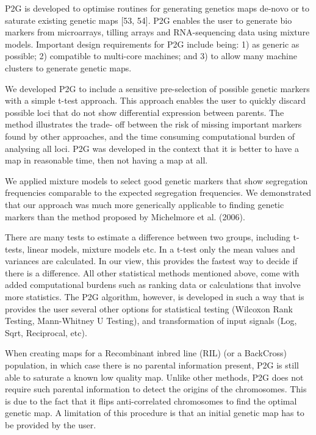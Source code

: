 P2G is developed to optimise routines for generating genetics maps de-novo or to saturate existing genetic maps [53, 54]. P2G enables 
the user to generate bio markers from microarrays, tilling arrays and RNA-sequencing data using mixture models. Important design 
requirements for P2G include being: 1) as generic as possible; 2) compatible to multi-core machines; and 3) to allow many machine 
clusters to generate genetic maps.

We developed P2G to include a sensitive pre-selection of possible genetic markers with a simple t-test approach. This approach enables 
the user to quickly discard possible loci that do not show differential expression between parents. The method illustrates the trade-
off between the risk of missing important markers found by other approaches, and the time consuming computational burden of analysing 
all loci. P2G was developed in the context that it is better to have a map in reasonable time, then not having a map at all.

We applied mixture models to select good genetic markers that show segregation frequencies comparable to the expected segregation 
frequencies. We demonstrated that our approach was much more generically applicable to finding genetic markers than the method 
proposed by Michelmore et al. (2006).

There are many tests to estimate a difference between two groups, including t-tests, linear models, mixture models etc. In a t-test 
only the mean values and variances are calculated. In our view, this provides the fastest way to decide if there is a difference. 
All other statistical methods mentioned above, come with added computational burdens such as ranking data or calculations that involve 
more statistics. The P2G algorithm, however, is developed in such a way that is provides the user several other options for statistical 
testing (Wilcoxon Rank Testing, Mann-Whitney U Testing), and transformation of input signals (Log, Sqrt, Reciprocal, etc).

When creating maps for a Recombinant inbred line (RIL) (or a BackCross) population, in which case there is no parental information 
present, P2G is still able to saturate a known low quality map. Unlike other methods, P2G does not require such parental information 
to detect the origins of the chromosomes. This is due to the fact that it flips anti-correlated chromosomes to find the optimal 
genetic map. A limitation of this procedure is that an initial genetic map has to be provided by the user.

